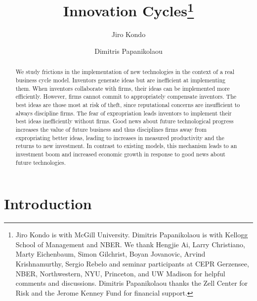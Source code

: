 \documentclass[12pt]{article}
\begin{document}
\setlength{\textwidth}{6.5in} \setlength{\oddsidemargin}{0.0in} \setlength{\textheight}{8.65in}
\setlength{\topmargin}{-0.1in} \setlength{\headheight}{0.0in} \footnotesep 9pt
 \setlength{\baselineskip}{1.45\baselineskip}
\doublespacing
\title{Innovation Cycles\thanks{Jiro Kondo is with McGill University.  Dimitris Papanikolaou is with Kellogg School of Management and NBER. We thank Hengjie Ai, Larry Christiano, Marty Eichenbaum, Simon Gilchrist, Boyan Jovanovic, Arvind Krishnamurthy, Sergio Rebelo and seminar participants at CEPR Gerzensee, NBER, Northwestern, NYU, Princeton, and UW Madison for helpful comments and discussions. Dimitris Papanikolaou thanks the Zell Center for Risk and the Jerome Kenney Fund for financial support. }}
\author{Jiro Kondo  \and Dimitris Papanikolaou }
\date{}
\maketitle
\thispagestyle{empty}

\vspace{ -.1in }
\begin{abstract}
\noindent We study frictions in the implementation of new technologies in the context of a real business cycle model. Inventors generate ideas but are inefficient at implementing them. When inventors collaborate with firms, their ideas can be implemented more efficiently. However, firms cannot commit to appropriately compensate inventors. The best ideas are those most at risk of theft, since reputational concerns are insufficient to always discipline firms. The fear of expropriation leads inventors to  implement their best ideas inefficiently without firms.  Good news about future technological progress increases the value of future business and thus disciplines firms away from  expropriating better ideas, leading to increases in measured productivity and the returns to new investment. In contrast to existing models, this mechanism leads to an investment boom and increased economic growth in response to good news about future technologies.
\end{abstract}

\setcounter{page}{0}
\thispagestyle{empty}
\newpage





\section*{Introduction}
\end{document}
